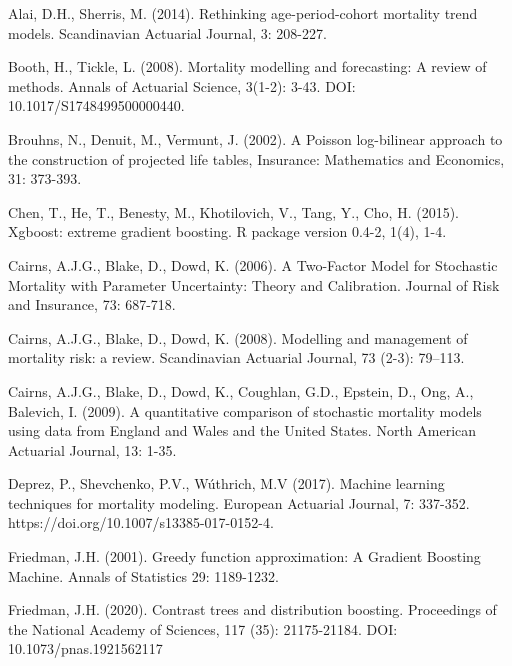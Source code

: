 \documentclass[fleqn,10pt]{wlscirep}
\begin{document}
%
\begin{thebibliography}{99}

Alai, D.H., Sherris, M. (2014). Rethinking age-period-cohort mortality trend models. Scandinavian Actuarial Journal, 3: 208-227.

Booth, H., Tickle, L. (2008). Mortality modelling and forecasting: A review of methods. Annals of Actuarial Science, 3(1-2): 3-43. DOI: 10.1017/S1748499500000440.

Brouhns, N., Denuit, M., Vermunt, J. (2002). A Poisson log-bilinear approach to the construction of projected life tables, Insurance: Mathematics and Economics, 31: 373-393.

Chen, T., He, T., Benesty, M., Khotilovich, V., Tang, Y., Cho, H. (2015). Xgboost: extreme gradient boosting. R package version 0.4-2, 1(4), 1-4.

Cairns, A.J.G., Blake, D., Dowd, K. (2006). A Two-Factor Model for Stochastic Mortality with Parameter Uncertainty: Theory and Calibration. Journal of Risk and Insurance, 73: 687-718.

Cairns, A.J.G., Blake, D., Dowd, K. (2008). Modelling and management of mortality risk: a review. Scandinavian Actuarial Journal, 73 (2-3): 79–113.

Cairns, A.J.G., Blake, D., Dowd, K., Coughlan, G.D., Epstein, D., Ong, A., Balevich, I. (2009). A quantitative comparison of stochastic mortality models using data from England and Wales and the United States. North American Actuarial Journal, 13: 1-35.

Deprez, P., Shevchenko, P.V., W\'uthrich, M.V (2017). Machine learning techniques for mortality modeling. European Actuarial Journal, 7: 337-352. https://doi.org/10.1007/s13385-017-0152-4.

Friedman, J.H. (2001). Greedy function approximation: A Gradient Boosting Machine. Annals of Statistics 29: 1189-1232.

Friedman, J.H. (2020). Contrast trees and distribution boosting. Proceedings of the National Academy of Sciences, 117 (35): 21175-21184. DOI: 10.1073/pnas.1921562117


\end{thebibliography}
\end{document}
